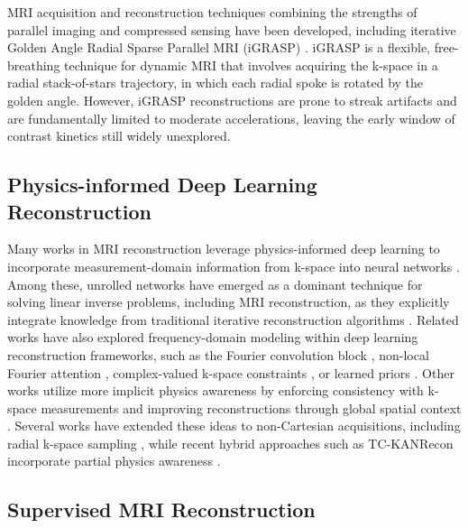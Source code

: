 \documentclass[runningheads]{llncs}
\begin{document}
MRI acquisition and reconstruction techniques combining the strengths of parallel imaging and compressed sensing have been developed, including iterative Golden Angle Radial Sparse Parallel MRI (iGRASP) \cite{Feng2014Golden}. iGRASP is a flexible, free-breathing technique for dynamic MRI that involves acquiring the k-space in a radial stack-of-stars trajectory, in which each radial spoke is rotated by the golden angle. However, iGRASP reconstructions are prone to streak artifacts and are fundamentally limited to moderate accelerations, leaving the early window of contrast kinetics still widely unexplored.


\subsection{Physics-informed Deep Learning Reconstruction}

Many works in MRI reconstruction leverage physics-informed deep learning to incorporate measurement-domain information from k-space into neural networks \cite{Wang2024KnowledgeDrivenFastMRI}. Among these, unrolled networks have emerged as a dominant technique for solving linear inverse problems, including MRI reconstruction, as they explicitly integrate knowledge from traditional iterative reconstruction algorithms \cite{Chen2025UnrolledInverseProblems,10629179,Ramzi2022NCPDNet,Kofler2021EndToEndRadialCineMRI}. Related works have also explored frequency-domain modeling within deep learning reconstruction frameworks, such as the Fourier convolution block \cite{SUN2025103349}, non-local Fourier attention \cite{ZHOU2023104632}, complex-valued k-space constraints \cite{10412627}, or learned priors \cite{Liu2020AutoencodingPriorsMRI}. Other works utilize more implicit physics awareness by enforcing consistency with k-space measurements and improving reconstructions through global spatial context \cite{10075478,10629179}. Several works have extended these ideas to non-Cartesian acquisitions, including radial k-space sampling \cite{He2023,s22197277}, while recent hybrid approaches such as TC-KANRecon incorporate partial physics awareness \cite{Ge2025TCKANRecon}.

\subsection{Supervised MRI Reconstruction}
\end{document}
